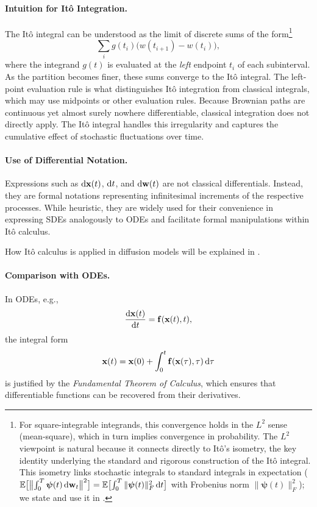 \paragraph{Intuition for It\^o Integration.}
The It\^o integral can be understood as the limit of discrete sums of
the form\footnote{For square-integrable integrands, this convergence holds in the $L^2$ sense (mean-square), which in turn implies convergence in probability. The $L^2$ viewpoint is natural because it connects directly to It\^o's isometry, the key identity underlying the standard and rigorous construction of the It\^o integral. This isometry links stochastic integrals to standard integrals in expectation ($\mathbb{E}\bigl[\bigl\|\int_0^T \bm{\psi}(t)\,\mathrm{d}{\mathbf{w}}_t \bigr\|^2\bigr] = \mathbb{E}\bigl[\int_0^T \|\bm{\psi}(t)\|_F^2\,\mathrm{d}t\bigr]$ with Frobenius norm
$\|\bm{\psi}(t)\|_F^2$); we state and use it in .}
\[
\sum_i g(t_i)\bigl(w(t_{i+1})-w(t_i)\bigr),
\]
where the integrand $g(t)$ is evaluated at the \emph{left} endpoint
$t_i$ of each subinterval. As the partition becomes finer, these sums
converge to the It\^o integral. The left-point evaluation rule is what
distinguishes It\^o integration from classical integrals, which may use
midpoints or other evaluation rules. Because Brownian paths are
continuous yet almost surely nowhere differentiable, classical
integration does not directly apply. The It\^o integral handles this
irregularity and captures the cumulative effect of stochastic
fluctuations over time.

\paragraph{Use of Differential Notation.}
Expressions such as $ \mathop{}\!\mathrm{d} {\mathbf{x}}(t) $, $ \mathop{}\!\mathrm{d} t $, and $ \mathop{}\!\mathrm{d} {\mathbf{w}}(t) $ are not classical differentials. Instead, they are formal notations representing infinitesimal increments of the respective processes. While heuristic, they are widely used for their convenience in expressing SDEs analogously to ODEs and facilitate formal manipulations within Itô calculus.

How Itô calculus is applied in diffusion models will be explained in .


\paragraph{Comparison with ODEs.}
In ODEs, e.g.,
\[
\frac{\mathop{}\!\mathrm{d} {\mathbf{x}}(t)}{\mathop{}\!\mathrm{d} t} = {\mathbf{f}}({\mathbf{x}}(t), t),
\]
the integral form
\[
{\mathbf{x}}(t) = {\mathbf{x}}(0) + \int_0^t {\mathbf{f}}({\mathbf{x}}(\tau), \tau) \mathop{}\!\mathrm{d} \tau
\]
is justified by the \emph{Fundamental Theorem of Calculus}, which ensures that differentiable functions can be recovered from their derivatives.

